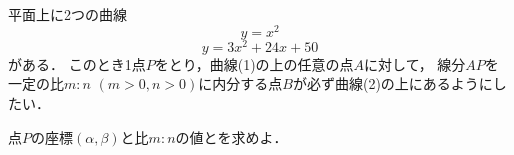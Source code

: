 \documentclass[../../main.tex]{subfiles}
\begin{document}
平面上に2つの曲線
\begin{equation} y=x^2
\end{equation}
\begin{equation} y=3x^2+24x+50
\end{equation}
がある．
このとき1点$P$をとり，曲線(1)の上の任意の点$A$に対して，
線分$AP$を一定の比$m:n$ $(m>0,n>0)$に内分する点$B$が必ず曲線(2)の上にあるようにしたい．

点$P$の座標$(\alpha,\beta)$と比$m:n$の値とを求めよ．
\end{document}
